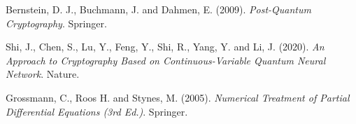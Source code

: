 \documentclass[%
    corpo=11pt,
    twoside,
    stile=classica,
    oldstyle,
    autoretitolo,
    tipotesi=magistrale,
    greek,
    evenboxes,
    english
]{toptesi}
\begin{document}
\begin{thebibliography}{99}
 {\sc Bernstein, D. J.}, {\sc Buchmann, J.} and {\sc Dahmen, E.} (2009). \textit{Post-Quantum Cryptography}. Springer.

 {\sc Shi, J.}, {\sc Chen, S.}, {\sc Lu, Y.}, {\sc Feng, Y.}, {\sc Shi, R.}, {\sc Yang, Y.} and {\sc Li, J.} (2020). \textit{An Approach to Cryptography Based on Continuous-Variable Quantum Neural Network}. Nature.

 {\sc Grossmann, C.}, {\sc Roos H.} and {\sc Stynes, M.} (2005). \textit{Numerical Treatment of Partial Differential Equations (3rd Ed.)}. Springer.
\end{thebibliography}
\end{document}
